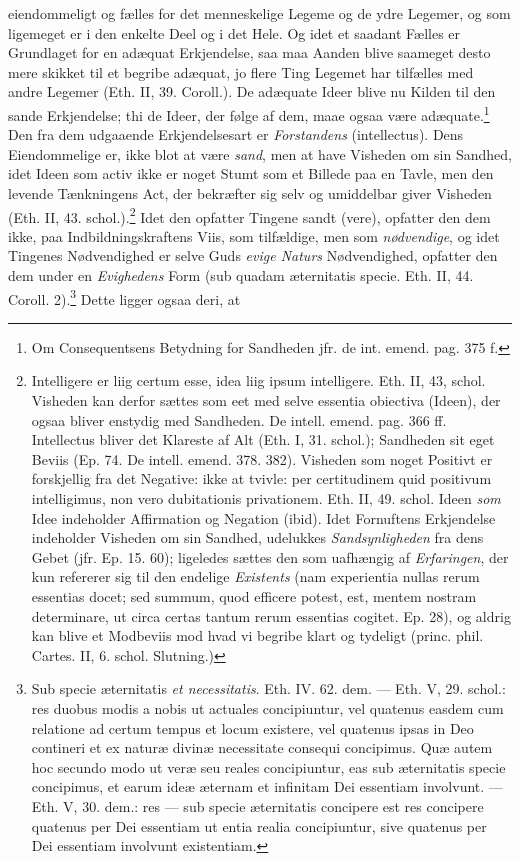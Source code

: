 \documentclass[12pt,a4paper]{book}
\newcommand{\opage}[1]{\marginnote{\footnotesize\textit{[#1]}}}
\begin{document}
eiendommeligt og fælles for det menneskelige Legeme og de
ydre Legemer, og som ligemeget er i den enkelte Deel og i det
Hele. Og idet et saadant Fælles er Grundlaget for en adæquat
Erkjendelse, saa maa Aanden blive saameget desto mere skikket
til et begribe adæquat, jo flere Ting Legemet har tilfælles
med andre Legemer (Eth. II, 39. Coroll.). De adæquate Ideer
blive nu Kilden til den sande Erkjendelse; thi de Ideer, der
følge af dem, maae ogsaa være adæquate.\footnote{Om
Consequentsens Betydning for Sandheden jfr. de int. emend.
pag. 375 f.} Den fra dem udgaaende Erkjendelsesart er
\emph{Forstandens} (intellectus). Dens Eiendommelige er, ikke
blot at være \emph{sand}, men at have Visheden om sin Sandhed,
idet Ideen som activ ikke er noget Stumt som et Billede paa en
Tavle, men den levende Tænkningens Act, der bekræfter sig selv
og umiddelbar giver Visheden (Eth. II, 43.
\opage{93} \setcounter{footnote}{0}%
schol.).\footnote{Intelligere er liig certum esse, idea liig
ipsum intelligere. Eth. II, 43, schol. Visheden kan derfor
sættes som eet med selve essentia obiectiva (Ideen), der ogsaa
bliver enstydig med Sandheden. De intell. emend. pag. 366 ff.
Intellectus bliver det Klareste af Alt (Eth. I, 31. schol.);
Sandheden sit eget Beviis (Ep. 74. De intell. emend. 378.
382). Visheden som noget Positivt er forskjellig fra det
Negative: ikke at tvivle: per certitudinem quid positivum
intelligimus, non vero dubitationis privationem. Eth. II, 49.
schol. Ideen \emph{som} Idee indeholder Affirmation og Negation
(ibid). Idet Fornuftens Erkjendelse indeholder Visheden om sin
Sandhed, udelukkes \emph{Sandsynligheden} fra dens Gebet (jfr.
Ep. 15. 60); ligeledes sættes den som uafhængig af
\emph{Erfaringen}, der kun refererer sig til den endelige
\emph{Existents} (nam experientia nullas rerum essentias
docet; sed summum, quod efficere potest, est, mentem nostram
determinare, ut circa certas tantum rerum essentias cogitet.
Ep. 28), og aldrig kan blive et Modbeviis mod hvad vi begribe
klart og tydeligt (princ. phil. Cartes. II, 6. schol.
Slutning.)} Idet den opfatter Tingene sandt (vere), opfatter
den dem ikke, paa Indbildningskraftens Viis, som tilfældige,
men som \emph{nødvendige}, og idet Tingenes Nødvendighed er selve
Guds \emph{evige Naturs} Nødvendighed, opfatter den dem under en
\emph{Evighedens} Form (sub quadam æternitatis specie. Eth. II, 44.
Coroll. 2).\footnote{Sub specie æternitatis \emph{et
necessitatis}. Eth. IV. 62. dem. --- Eth. V, 29. schol.:
res duobus modis a nobis ut actuales concipiuntur, vel
quatenus easdem cum relatione ad certum tempus et locum
existere, vel quatenus ipsas in Deo contineri et ex naturæ
divinæ necessitate consequi concipimus. Quæ autem hoc secundo
modo ut veræ seu reales concipiuntur, eas sub æternitatis
specie concipimus, et earum ideæ æternam et infinitam Dei
essentiam involvunt. --- Eth. V, 30. dem.: res --- sub specie
æternitatis concipere est res concipere quatenus per Dei
essentiam ut entia realia concipiuntur, sive quatenus per Dei
essentiam involvunt existentiam.} Dette ligger ogsaa deri, at
\end{document}
